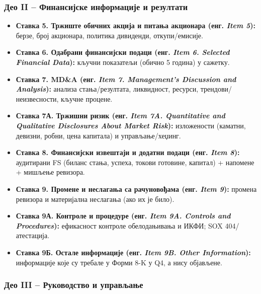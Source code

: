 \subsubsection{Део II – Финансијске информације и резултати}

\begin{itemize}
\item \textbf{Ставка 5. Тржиште обичних акција и питања акционара (енг. \textit{Item 5}):} берзе, број акционара, политика дивиденди, откупи/емисије.

\item \textbf{Ставка 6. Одабрани финансијски подаци (енг. \textit{Item 6. Selected Financial Data}):} кључни показатељи (обично 5 година) у сажетку.

\item \textbf{Ставка 7. MD\&A (енг. \textit{Item 7. Management's Discussion and Analysis}):} анализа стања/резултата, ликвидност, ресурси, трендови/неизвесности, кључне процене.

\item \textbf{Ставка 7А. Тржишни ризик (енг. \textit{Item 7A. Quantitative and Qualitative Disclosures About Market Risk}):} изложености (каматни, девизни, робни, цена капитала) и управљање/хеџинг.

\item \textbf{Ставка 8. Финансијски извештаји и додатни подаци (енг. \textit{Item 8}):} аудитирани FS (биланс стања, успеха, токови готовине, капитал) + напомене + мишљење ревизора.

\item \textbf{Ставка 9. Промене и неслагања са рачуновођама (енг. \textit{Item 9}):} промена ревизора и материјална неслагања (ако их је било).

\item \textbf{Ставка 9А. Контроле и процедуре (енг. \textit{Item 9A. Controls and Procedures}):} ефикасност контроле обелодањивања и ИКФИ; SOX 404/атестација.

\item \textbf{Ставка 9Б. Остале информације (енг. \textit{Item 9B. Other Information}):} информације које су требале у Форми 8-K у Q4, а нису објављене.
\end{itemize}

\subsubsection{Део III – Руководство и управљање}

